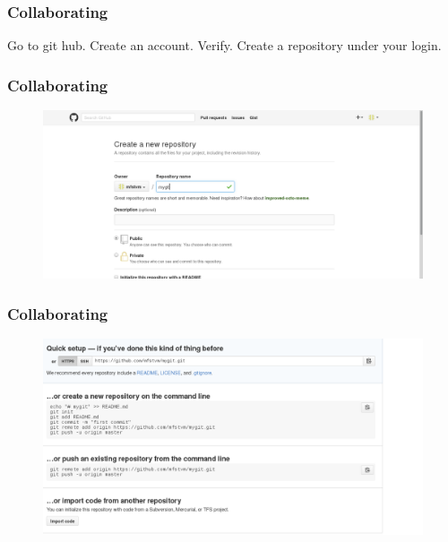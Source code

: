 \documentclass[10pt,a4paper]{beamer}
\begin{document}
 
\begin{frame}[fragile]
\frametitle{ Collaborating }

 Go to git hub. Create an account. Verify.  Create a repository under your login.

\end{frame}


 
\begin{frame}[fragile]
\frametitle{ Collaborating }
 
\begin{figure}
  \includegraphics[scale=.3]{24}
 \end{figure}
\end{frame}

\begin{frame}[fragile]
\frametitle{ Collaborating }
 
\begin{figure}
  \includegraphics[scale=.3]{25}
 \end{figure}
\end{frame}
%
% 
%
%
%
%
%
%
%
%
%
%
%
%
%
%
%
\end{document}
